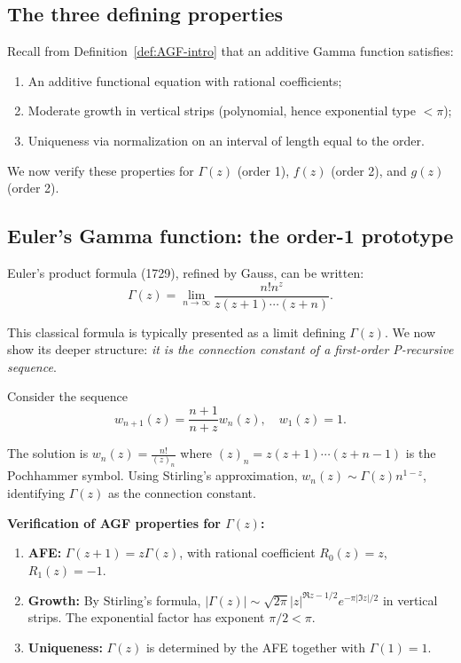 \documentclass[11pt,reqno]{amsart}
\theoremstyle{definition}
\numberwithin{equation}{section}
\begin{document}
\subsection{The three defining properties}

Recall from Definition~\ref{def:AGF-intro} that an additive Gamma function satisfies:
\begin{enumerate}[label=(\roman*)]
\item An additive functional equation with rational coefficients;
\item Moderate growth in vertical strips (polynomial, hence exponential type $<\pi$);
\item Uniqueness via normalization on an interval of length equal to the order.
\end{enumerate}

We now verify these properties for $\Gamma(z)$ (order 1), $f(z)$ (order 2), and $g(z)$ (order 2).

\subsection{Euler's Gamma function: the order-1 prototype}

Euler's product formula (1729), refined by Gauss, can be written:
$$\Gamma(z) = \lim_{n\to\infty} \frac{n! n^z}{z(z+1)\cdots(z+n)}.$$

This classical formula is typically presented as a limit defining $\Gamma(z)$. We now show its deeper structure: \textit{it is the connection constant of a first-order P-recursive sequence}.

Consider the sequence
\begin{equation}\label{eq:gamma-recurrence}
w_{n+1}(z) = \frac{n+1}{n+z} w_n(z), \quad w_1(z) = 1.
\end{equation}

The solution is $w_n(z) = \frac{n!}{(z)_n}$ where $(z)_n = z(z+1)\cdots(z+n-1)$ is the Pochhammer symbol. Using Stirling's approximation, $w_n(z) \sim \Gamma(z) n^{1-z}$, identifying $\Gamma(z)$ as the connection constant.

\textbf{Verification of AGF properties for $\Gamma(z)$:}
\begin{enumerate}[label=(\roman*)]
\item \textbf{AFE:} $\Gamma(z+1) = z\Gamma(z)$, with rational coefficient $R_0(z) = z$, $R_1(z) = -1$.
\item \textbf{Growth:} By Stirling's formula, $|\Gamma(z)| \sim \sqrt{2\pi}|z|^{\Re z - 1/2}e^{-\pi|\Im z|/2}$ in vertical strips. The exponential factor has exponent $\pi/2 < \pi$.
\item \textbf{Uniqueness:} $\Gamma(z)$ is determined by the AFE together with $\Gamma(1) = 1$.
\end{enumerate}
\end{document}
